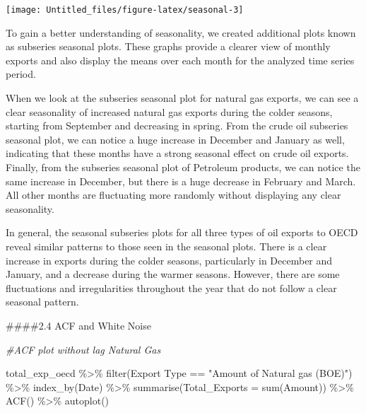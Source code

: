 \documentclass[
]{article}
\newenvironment{Shaded}{\begin{snugshade}}{\end{snugshade}}
\newcommand{\AttributeTok}[1]{\textcolor[rgb]{0.77,0.63,0.00}{#1}}
\newcommand{\CommentTok}[1]{\textcolor[rgb]{0.56,0.35,0.01}{\textit{#1}}}
\newcommand{\FunctionTok}[1]{\textcolor[rgb]{0.00,0.00,0.00}{#1}}
\newcommand{\NormalTok}[1]{#1}
\newcommand{\SpecialCharTok}[1]{\textcolor[rgb]{0.00,0.00,0.00}{#1}}
\newcommand{\StringTok}[1]{\textcolor[rgb]{0.31,0.60,0.02}{#1}}
\begin{document}
\begin{center}\texttt{[image: Untitled\_files/figure-latex/seasonal-3]} \end{center}

To gain a better understanding of seasonality, we created additional
plots known as subseries seasonal plots. These graphs provide a clearer
view of monthly exports and also display the means over each month for
the analyzed time series period.

When we look at the subseries seasonal plot for natural gas exports, we
can see a clear seasonality of increased natural gas exports during the
colder seasons, starting from September and decreasing in spring. From
the crude oil subseries seasonal plot, we can notice a huge increase in
December and January as well, indicating that these months have a strong
seasonal effect on crude oil exports. Finally, from the subseries
seasonal plot of Petroleum products, we can notice the same increase in
December, but there is a huge decrease in February and March. All other
months are fluctuating more randomly without displaying any clear
seasonality.

In general, the seasonal subseries plots for all three types of oil
exports to OECD reveal similar patterns to those seen in the seasonal
plots. There is a clear increase in exports during the colder seasons,
particularly in December and January, and a decrease during the warmer
seasons. However, there are some fluctuations and irregularities
throughout the year that do not follow a clear seasonal pattern.

\#\#\#\#2.4 ACF and White Noise

\begin{Shaded}
\begin{Highlighting}[]
\CommentTok{\#ACF plot without lag Natural Gas}

\NormalTok{total\_exp\_oecd }\SpecialCharTok{\%\textgreater{}\%} \FunctionTok{filter}\NormalTok{(}\StringTok{\textasciigrave{}}\AttributeTok{Export Type}\StringTok{\textasciigrave{}} \SpecialCharTok{==} \StringTok{"Amount of Natural gas (BOE)"}\NormalTok{) }\SpecialCharTok{\%\textgreater{}\%} 
  \FunctionTok{index\_by}\NormalTok{(Date) }\SpecialCharTok{\%\textgreater{}\%} 
  \FunctionTok{summarise}\NormalTok{(}\AttributeTok{Total\_Exports =} \FunctionTok{sum}\NormalTok{(}\StringTok{\textasciigrave{}}\AttributeTok{Amount}\StringTok{\textasciigrave{}}\NormalTok{)) }\SpecialCharTok{\%\textgreater{}\%} 
  \FunctionTok{ACF}\NormalTok{() }\SpecialCharTok{\%\textgreater{}\%}  \FunctionTok{autoplot}\NormalTok{()}
\end{Highlighting}
\end{Shaded}
\end{document}
